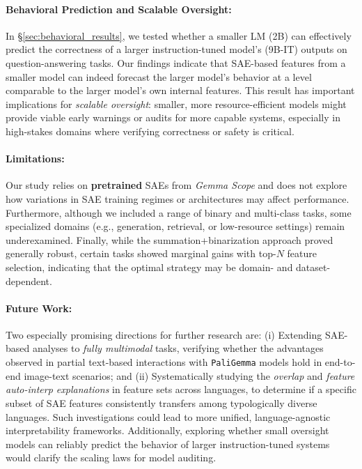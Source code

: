\paragraph{Behavioral Prediction and Scalable Oversight:}
In \S\ref{sec:behavioral_results}, we tested whether a smaller LM (2B) can effectively predict the correctness of a larger instruction-tuned model’s (9B-IT) outputs on question-answering tasks. Our findings indicate that SAE-based features from a smaller model can indeed forecast the larger model’s behavior at a level comparable to the larger model’s own internal features. This result has important implications for \emph{scalable oversight}: smaller, more resource-efficient models might provide viable early warnings or audits for more capable systems, especially in high-stakes domains where verifying correctness or safety is critical.

\paragraph{Limitations:}
Our study relies on \textbf{pretrained} SAEs from \emph{Gemma Scope} and does not explore how variations in SAE training regimes or architectures may affect performance. Furthermore, although we included a range of binary and multi-class tasks, some specialized domains (e.g., generation, retrieval, or low-resource settings) remain underexamined. Finally, while the summation+binarization approach proved generally robust, certain tasks showed marginal gains with top-$N$ feature selection, indicating that the optimal strategy may be domain- and dataset- dependent.

\paragraph{Future Work:}
Two especially promising directions for further research are: (i) Extending SAE-based analyses to \emph{fully multimodal} tasks, verifying whether the advantages observed in partial text-based interactions with \texttt{PaliGemma} models hold in end-to-end image-text scenarios; and (ii) Systematically studying the \emph{overlap} and \emph{feature auto-interp explanations} in feature sets across languages, to determine if a specific subset of SAE features consistently transfers among typologically diverse languages. Such investigations could lead to more unified, language-agnostic interpretability frameworks. Additionally, exploring whether small oversight models can reliably predict the behavior of larger instruction-tuned systems would clarify the scaling laws for model auditing.
